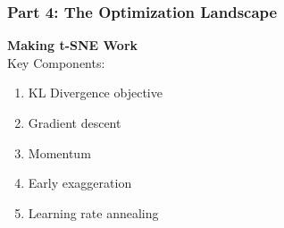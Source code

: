 \documentclass[aspectratio=169]{beamer}
\begin{document}
\begin{frame}
\frametitle{Part 4: The Optimization Landscape}

\begin{center}
\LARGE{\textbf{Making t-SNE Work}}\\[1cm]

Key Components:
\begin{enumerate}
\item KL Divergence objective
\item Gradient descent
\item Momentum
\item Early exaggeration
\item Learning rate annealing
\end{enumerate}
\end{center}

\end{frame}
\end{document}

